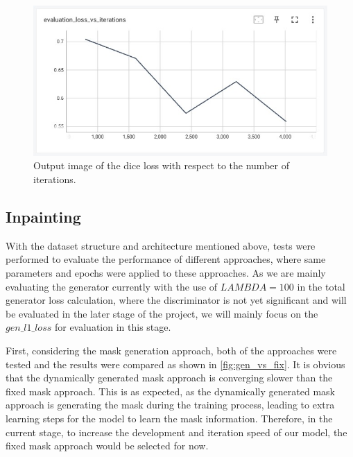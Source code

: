 \documentclass[10pt,twocolumn,letterpaper]{article}
\begin{document}
\begin{figure}[t]
    \centering
    \includegraphics[width=\linewidth]{figures/milestone/out_loss.jpg}
    \caption{Output image of the dice loss with respect to the number of iterations. }
    \label{fig:out_loss}
\end{figure}

\subsection{Inpainting}

With the dataset structure and architecture mentioned above, tests were performed to evaluate the performance of different approaches, where same parameters and epochs were applied to these 
approaches. As we are mainly evaluating the generator currently with the use of $LAMBDA = 100$ in the total generator loss calculation, where the discriminator is not yet significant and will be
evaluated in the later stage of the project, we will mainly focus on the $gen\_l1\_loss$ for evaluation in this stage. 

First, considering the mask generation approach, both of the approaches were tested and the results were compared as shown in \cref{fig:gen_vs_fix}. It is obvious that the dynamically generated mask 
approach is converging slower than the fixed mask approach. This is as expected, as the dynamically generated mask approach is generating the mask during the training process, leading to extra learning
steps for the model to learn the mask information. Therefore, in the current stage, to increase the development and iteration speed of our model, the fixed mask approach would be selected for now.
\end{document}
